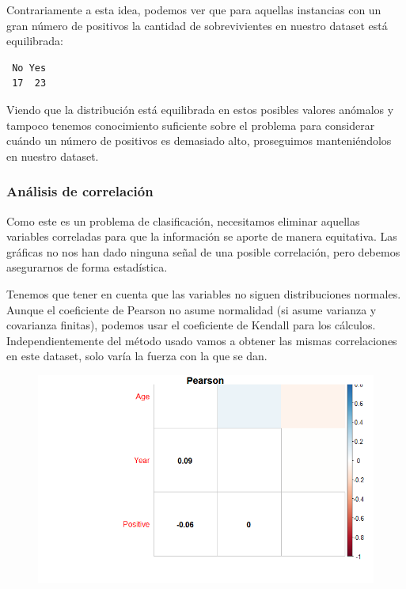 Contrariamente a esta idea, podemos ver que para aquellas instancias con un gran número de positivos la cantidad de sobrevivientes en nuestro dataset está equilibrada:

\begin{verbatim}
 No Yes 
 17  23 
\end{verbatim}

Viendo que la distribución está equilibrada en estos posibles valores anómalos y tampoco tenemos conocimiento suficiente sobre el problema para considerar cuándo un número de positivos es demasiado alto, proseguimos manteniéndolos en nuestro dataset.

\subsubsection{Análisis de correlación}

Como este es un problema de clasificación, necesitamos eliminar aquellas variables correladas para que la información se aporte de manera equitativa. Las gráficas no nos han dado ninguna señal de una posible correlación, pero debemos asegurarnos de forma estadística.

\vspace{\baselineskip}

Tenemos que tener en cuenta que las variables no siguen distribuciones normales. Aunque el coeficiente de Pearson no asume normalidad (si asume varianza y covarianza finitas), podemos usar el coeficiente de Kendall para los cálculos. Independientemente del método usado vamos a obtener las mismas correlaciones en este dataset, solo varía la fuerza con la que se dan.

\newpage

\begin{figure}[H]\includegraphics[width=\linewidth]{img/EDA2_files/corr1.png} \end{figure}


